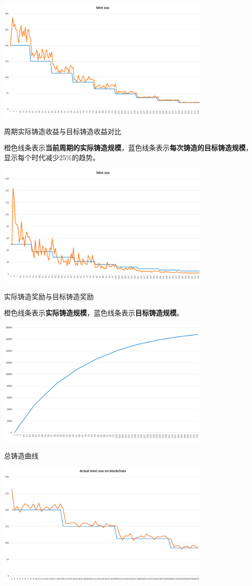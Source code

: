 \documentclass[
]{article}
\begin{document}
\includegraphics[width=400px]{image}

周期实际铸造收益与目标铸造收益对比

橙色线条表示\textbf{当前周期的实际铸造规模}，蓝色线条表示\textbf{每次铸造的目标铸造规模}，显示每个时代减少25\%的趋势。

\includegraphics[width=400px]{image1}

实际铸造奖励与目标铸造奖励

橙色线条表示\textbf{实际铸造规模}，蓝色线条表示\textbf{目标铸造规模}。

\includegraphics[width=400px]{image2}

总铸造曲线

\includegraphics[width=400px]{image3}
\end{document}
